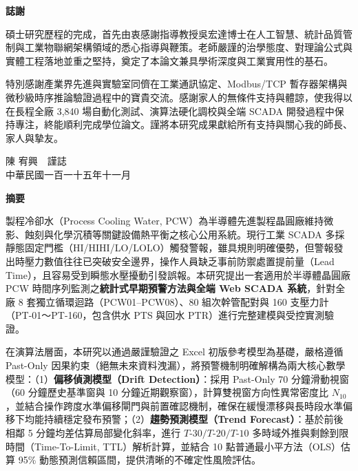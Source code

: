 \documentclass[fontset=none, a4paper, 12pt]{ctexart}
\begin{document}
\clearpage
{}
\pagestyle{empty}
\begin{center}
    \large\bfseries 誌謝
\end{center}
\vspace{0.5em}

碩士研究歷程的完成，首先由衷感謝指導教授吳宏達博士在人工智慧、統計品質管制與工業物聯網架構領域的悉心指導與鞭策。老師嚴謹的治學態度、對理論公式與實體工程落地並重之堅持，奠定了本論文兼具學術深度與工業實用性的基石。

特別感謝產業界先進與實驗室同儕在工業通訊協定、Modbus/TCP 暫存器架構與微秒級時序推論驗證過程中的寶貴交流。感謝家人的無條件支持與體諒，使我得以在長程全廠 3,840 場自動化測試、演算法硬化調校與全端 SCADA 開發過程中保持專注，終能順利完成學位論文。謹將本研究成果獻給所有支持與關心我的師長、家人與摯友。

\vspace{2em}
\begin{flushright}
陳 宥興　謹誌\\
中華民國一百一十五年十一月
\end{flushright}

\clearpage
\pagestyle{plain}
\setcounter{page}{1}

{}
\begin{center}
\large\bfseries 摘要
\end{center}
\vspace{0.5em}

製程冷卻水（Process Cooling Water, PCW）為半導體先進製程晶圓廠維持微影、蝕刻與化學沉積等關鍵設備熱平衡之核心公用系統。現行工業 SCADA 多採靜態固定門檻（HI/HIHI/LO/LOLO）觸發警報，雖具規則明確優勢，但警報發出時壓力數值往往已突破安全邊界，操作人員缺乏事前防禦處置提前量（Lead Time），且容易受到瞬態水壓擾動引發誤報。本研究提出一套適用於半導體晶圓廠 PCW 時間序列監測之\textbf{統計式早期預警方法與全端 Web SCADA 系統}，針對全廠 8 套獨立循環迴路（PCW01–PCW08）、80 組次幹管配對與 160 支壓力計（PT-01～PT-160，包含供水 PTS 與回水 PTR）進行完整建模與受控實測驗證。

在演算法層面，本研究以通過嚴謹驗證之 Excel 初版參考模型為基礎，嚴格遵循 Past-Only 因果約束（絕無未來資料洩漏），將預警機制明確解構為兩大核心數學模型：（1）\textbf{偏移偵測模型（Drift Detection）}：採用 Past-Only 70 分鐘滑動視窗（60 分鐘歷史基準窗與 10 分鐘近期觀察窗），計算雙視窗方向性異常密度比 $N_{10}$，並結合操作跨度水準偏移閘門與前置確認機制，確保在緩慢漂移與長時段水準偏移下均能持續穩定發布預警；（2）\textbf{趨勢預測模型（Trend Forecast）}：基於前後相鄰 5 分鐘均差估算局部變化斜率，進行 $T\text{-}30 / T\text{-}20 / T\text{-}10$ 多時域外推與剩餘到限時間（Time-To-Limit, TTL）解析計算，並結合 10 點普通最小平方法（OLS）估算 95\% 動態預測信賴區間，提供清晰的不確定性風險評估。
\end{document}
